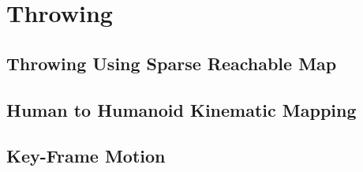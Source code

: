 \chapter{Throwing}\label{sec:baseball}
	
	
	\section{Throwing Using Sparse Reachable Map}\label{sec:sec:srm}
		

	\section{Human to Humanoid Kinematic Mapping}\label{sec:sec:mocap}
		

	\section{Key-Frame Motion}\label{sec:sec:keyframe}
		

